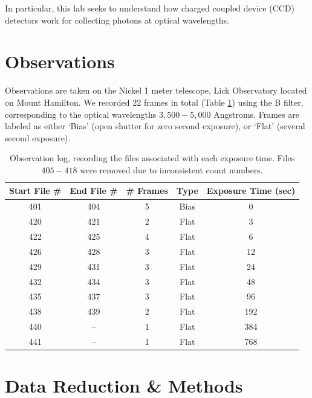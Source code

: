 \documentclass[preprint]{aastex62}
\begin{document}
In particular, this lab seeks to understand how charged coupled device (CCD) detectors work for collecting photons at optical wavelengths.

\section{Observations}
Observations are taken on the Nickel 1 meter telescope, Lick Observatory located on Mount Hamilton. We recorded 22 frames in total (Table \ref{table:log}) using the B filter, corresponding to the optical wavelengths $3,500-5,000$ Angstroms. Frames are labeled as either `Bias' (open shutter for zero second exposure), or `Flat' (several second exposure).

\begin{table}[H]
\centering
\begin{tabular}{|c|c|c|c|c|}
    \hline
    Start File \# & End File \# & \# Frames & Type  & Exposure Time (sec) \\
    \hline
    \hline
    401 & 404 & 5 & Bias & 0  \\
    420 & 421 & 2 & Flat & 3 \\
    422 & 425 & 4 & Flat & 6 \\
    426 & 428 & 3 & Flat & 12 \\
    429 & 431 & 3 & Flat & 24 \\
    432 & 434 & 3 & Flat & 48 \\
    435 & 437 & 3 & Flat & 96 \\
    438 & 439 & 2 & Flat & 192 \\
    440 & --  & 1 & Flat & 384 \\
    441 & --  & 1 & Flat & 768 \\
    \hline
\end{tabular}
\caption{Observation log, recording the files associated with each exposure time. Files $405-418$ were removed due to inconsistent count numbers.} \label{table:log}
\end{table}


\section{Data Reduction \& Methods}
\end{document}
